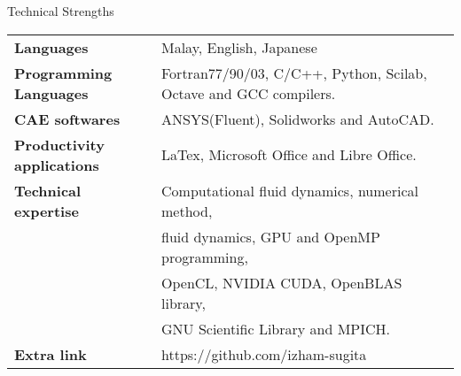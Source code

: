 \documentclass{resume} %
\begin{document}
\begin{rSection}{Technical Strengths}

\begin{tabular}{ @{} >{\bfseries}l @{\hspace{6ex}} l }
Languages & Malay, English, Japanese \\
Programming Languages & Fortran77/90/03, C/C++, Python, Scilab, Octave and GCC compilers. \\
CAE softwares & ANSYS(Fluent), Solidworks and AutoCAD. \\
Productivity applications & LaTex, Microsoft Office and Libre Office.\\
Technical expertise & Computational fluid dynamics, numerical method,\\ 
                    & fluid dynamics, GPU and OpenMP programming, \\
& OpenCL, NVIDIA CUDA, OpenBLAS library, \\
& GNU Scientific Library and  MPICH. \\
Extra link  & https://github.com/izham-sugita
\end{tabular}

\end{rSection}
\end{document}
